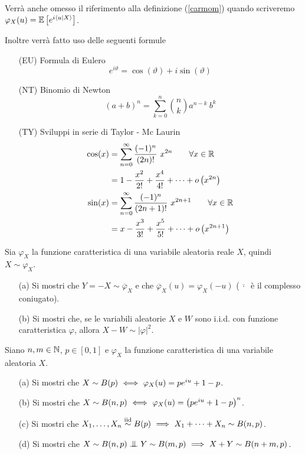 Verrà anche omesso il riferimento alla definizione (\ref{carmom}) quando scriveremo $\varphi_X(u)=\mathbb{E}\left[e^{i \langle u|X\rangle}\right]$.

Inoltre verrà fatto uso delle seguenti formule
\begin{enumerate}
\item [(EU)] Formula di Eulero
\[
e^{i \vartheta}=\cos(\vartheta) + i \sin (\vartheta)
\]
\item [(NT)] Binomio di Newton
\[
(a+b)^n=\sum_{k=0}^n\binom{n}{k}a^{n-k}\ b^k
\]
\item [(TY)] Sviluppi in serie di Taylor - Mc Laurin
\begin{gather*}
\begin{aligned}
\cos(x)&=\sum_{n=0}^\infty\frac{(-1)^n}{(2n)!}\ x^{2n}\qquad\forall x\in\RR \\
&=1-\frac{x^2}{2!}+\frac{x^4}{4!}+\cdots +o\left(x^{2n}\right)\\
\sin(x)&=\sum_{n=0}^\infty\frac{(-1)^n}{(2n+1)!}\ x^{2n+1}\qquad\forall x\in\RR\\
&=x-\frac{x^3}{3!}+\frac{x^5}{5!}+\cdots+o\left(x^{2n+1}\right)
\end{aligned}
\end{gather*}
\end{enumerate}

\newpage

%

\ParteEsercizi

\Esercizio{} %
Sia $\varphi_X$ la funzione caratteristica di una variabile aleatoria reale $X$, quindi $X\sim\varphi_X$.
\begin{enumerate}
\item [(a)] Si mostri che $Y=-X\sim\overline{\varphi}_X$ e che $\overline{\varphi}_X(u)=\varphi_X(-u)$ ($\overline{\ \cdot\ }$ è il complesso coniugato).
\item [(b)] Si mostri che, se le variabili aleatorie $X$ e $W$ sono i.i.d. con funzione caratteristica $\varphi$, allora $X-W\sim|\varphi|^2$.
\end{enumerate}

\Esercizio{} %
Siano $ n,m \in \mathbb{N}$, $p\in [0, 1]$ e $\varphi_X$ la funzione caratteristica di una variabile aleatoria $X$.
\begin{enumerate}
\item [(a)] Si mostri che $X\sim B(p)\ \Longleftrightarrow\ \varphi_X(u)=pe^{iu}+1-p$.
\item [(b)] Si mostri che $X\sim B(n,p)\ \Longleftrightarrow\ \varphi_X(u)=\left(pe^{iu}+1-p  \right)^n$.
\item [(c)] Si mostri che $X_1,\dots,X_n\stackrel{\mathrm{iid}}{\sim} B(p)\ \Longrightarrow\  X_1+\cdots+X_n\sim B(n,p)$.
\item [(d)] Si mostri che $X\sim B(n,p)\indep Y\sim B(m,p)\SE X+Y\sim B(n+m,p)$.
\end{enumerate}

